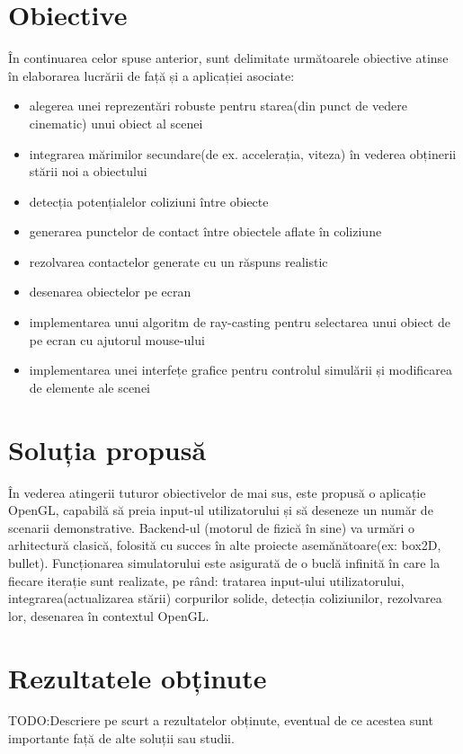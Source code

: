\documentclass[12pt,a4paper]{report}
\begin{document}
\section{Obiective}
În continuarea celor spuse anterior, sunt delimitate următoarele obiective atinse în elaborarea lucrării de față și a aplicației asociate:
\begin{itemize}
	\item alegerea unei reprezentări robuste pentru starea(din punct de vedere cinematic) unui obiect al scenei
	\item integrarea mărimilor secundare(de ex. accelerația, viteza) în vederea obținerii stării noi a obiectului
	\item detecția potențialelor coliziuni între obiecte
	\item generarea punctelor de contact între obiectele aflate în coliziune
	\item rezolvarea contactelor generate cu un răspuns realistic
	\item desenarea obiectelor pe ecran
	\item implementarea unui algoritm de ray-casting pentru selectarea unui obiect de pe ecran cu ajutorul mouse-ului
	\item implementarea unei interfețe grafice pentru controlul simulării și modificarea de elemente ale scenei
\end{itemize}
\section{Soluția propusă} 
În vederea atingerii tuturor obiectivelor de mai sus, este propusă o aplicație OpenGL, capabilă să preia input-ul utilizatorului și să deseneze un număr de scenarii demonstrative.
Backend-ul (motorul de fizică în sine) va urmări o arhitectură clasică, folosită cu succes în alte proiecte asemănătoare(ex: box2D\cite{box2D}, bullet\cite{bullet}). Funcționarea simulatorului este asigurată de o buclă infinită în care la fiecare iterație sunt realizate, pe rând: tratarea input-ului utilizatorului, integrarea(actualizarea stării) corpurilor solide,
detecția coliziunilor, rezolvarea lor, desenarea în contextul OpenGL.
\section{Rezultatele obținute}
TODO:Descriere pe scurt a rezultatelor obținute, eventual de ce acestea sunt importante față de alte soluții sau studii.
\end{document}
